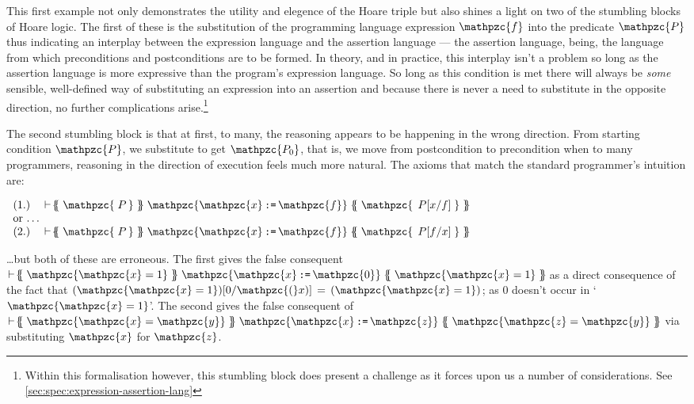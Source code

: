 \documentclass[oneside,12pt]{article}
\newcommand{\impcode}[1]{\textsc{\texttt{#1}}}
\newcommand{\codevar}[1]{\ensuremath{\mathpzc{#1}}}
\newcommand{\textM}[1]{\ensuremath{\mathpzc{#1}}}
\newcommand{\gtc}[3]{\!  \{\!\!\{ \; \textM{#1} \; \}\!\!\} \; \textM{#2} \;  \{\!\!\{ \; \textM{#3} \; \}\!\!\} \!}
\begin{document}
This first example not only demonstrates the utility and elegence of the Hoare triple but also shines a light on two of the stumbling blocks of Hoare logic. The first of these is the substitution of the programming language expression \textM{f} into the predicate \textM{P} thus indicating an interplay between the expression language and the assertion language --- the assertion language, being, the language from which preconditions and postconditions are to be formed. In theory, and in practice, this interplay isn't a problem so long as the assertion language is more expressive than the program's expression language. So long as this condition is met there will always be \emph{some} sensible, well-defined way of substituting an expression into an assertion and because there is never a need to substitute in the opposite direction, no further \mbox{complications} arise.\footnote{Within this formalisation however, this stumbling block does present a challenge as it forces upon us a number of considerations. See \autoref{sec:spec:expression-assertion-lang} }

\label{page:expassertionprob}

The second stumbling block is that at first, to many, the reasoning appears to be happening in the wrong direction. From starting condition \textM{P}, we substitute to get \textM{P_0}, that is, we move from postcondition to precondition when to many programmers, reasoning in the direction of execution feels much more natural. The axioms that match the standard programmer's intuition are:

\begin{center}
  $\begin{array}{l}
     \mbox{(1.) } \; \; \vdash \gtc{\;P\,}{\codevar{x} \, \impcode{:=} \, \codevar{f}} {\;\,P[x/f]\;}\;\; \\ \mbox{or \ldots} \\
     \mbox{(2.) } \; \; \vdash \gtc{\;P\,}{\codevar{x} \, \impcode{:=} \, \codevar{f}} {\;\,P[f/x]\;}
  \end{array}$
\end{center}

\ldots but both of these are erroneous. The first gives the false consequent $\vdash \gtc{\codevar{x} = 1}{\codevar{x} \, \impcode{:=} \, \codevar{0}}{\codevar{x} = 1}$ as a direct consequence of the fact that $(\textM{\codevar{x}=1})[0/\codevar(x)]\, = \, (\textM{\codevar{x}=1})$; as $0$ doesn't occur in `$\textM{\codevar{x}=1}$'. The second gives the false consequent of $\vdash \gtc{\codevar{x} = \codevar{y}}{\codevar{x} \, \impcode{:=} \, \codevar{z}}{\codevar{z} = \codevar{y}}$ via substituting \codevar{x} for \codevar{z}.
\end{document}
